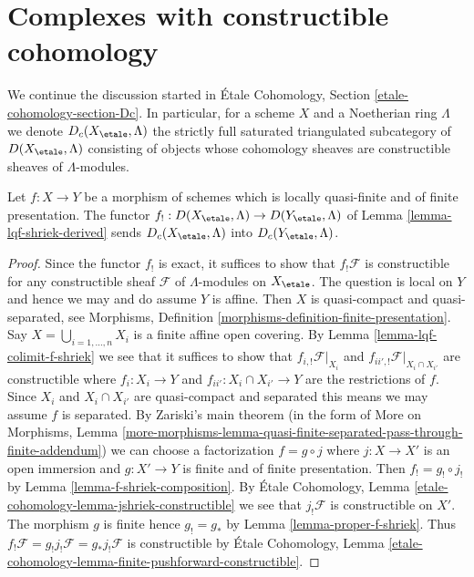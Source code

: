 \section{Complexes with constructible cohomology}
\label{section-Dc}

\noindent
We continue the discussion started in \'Etale Cohomology, Section
\ref{etale-cohomology-section-Dc}. In particular, for a scheme
$X$ and a Noetherian ring $\Lambda$ we denote
$D_c(X_\etale, \Lambda)$ the strictly full saturated triangulated
subcategory of $D(X_\etale, \Lambda)$ consisting of objects
whose cohomology sheaves are constructible sheaves of $\Lambda$-modules.

\begin{lemma}
\label{lemma-qf-f-shriek-constructible}
Let $f : X \to Y$ be a morphism of schemes which is
locally quasi-finite and of finite presentation.
The functor $f_! : D(X_\etale, \Lambda) \to D(Y_\etale, \Lambda)$
of Lemma \ref{lemma-lqf-shriek-derived}
sends $D_c(X_\etale, \Lambda)$ into $D_c(Y_\etale, \Lambda)$.
\end{lemma}

\begin{proof}
Since the functor $f_!$ is exact, it suffices to show that
$f_!\mathcal{F}$ is constructible for any constructible sheaf
$\mathcal{F}$ of $\Lambda$-modules on $X_\etale$.
The question is local on $Y$ and hence
we may and do assume $Y$ is affine.
Then $X$ is quasi-compact and quasi-separated, see
Morphisms, Definition \ref{morphisms-definition-finite-presentation}.
Say $X = \bigcup_{i = 1, \ldots, n} X_i$ is a finite affine open
covering. By Lemma \ref{lemma-lqf-colimit-f-shriek}
we see that it suffices to show that
$f_{i, !}\mathcal{F}|_{X_i}$ and $f_{ii', !}\mathcal{F}|_{X_i \cap X_{i'}}$
are constructible where $f_i : X_i \to Y$ and
$f_{ii'} : X_i \cap X_{i'} \to Y$ are the restrictions of $f$.
Since $X_i$ and $X_i \cap X_{i'}$ are quasi-compact and separated
this means we may assume $f$ is separated.
By Zariski's main theorem (in the form of
More on Morphisms, Lemma
\ref{more-morphisms-lemma-quasi-finite-separated-pass-through-finite-addendum})
we can choose a factorization $f = g \circ j$ where
$j : X \to X'$ is an open immersion and $g : X' \to Y$ is
finite and of finite presentation. Then $f_! = g_! \circ j_!$ by
Lemma \ref{lemma-f-shriek-composition}.
By \'Etale Cohomology, Lemma \ref{etale-cohomology-lemma-jshriek-constructible}
we see that $j_!\mathcal{F}$ is constructible on $X'$.
The morphism $g$ is finite hence $g_! = g_*$
by Lemma \ref{lemma-proper-f-shriek}.
Thus $f_!\mathcal{F} = g_!j_!\mathcal{F} = g_*j_!\mathcal{F}$
is constructible by
\'Etale Cohomology, Lemma
\ref{etale-cohomology-lemma-finite-pushforward-constructible}.
\end{proof}

